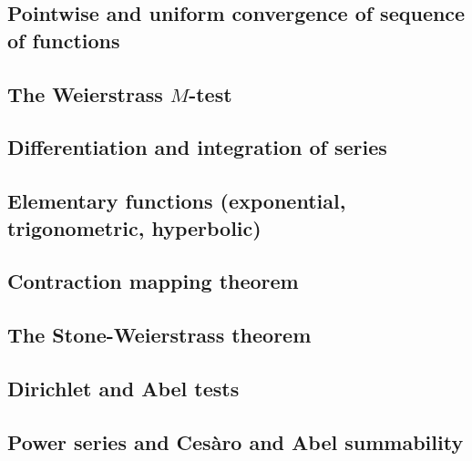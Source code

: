 \documentclass[11pt]{article}
\theoremstyle{definition}
\theoremstyle{plain}
\theoremstyle{remark}
\begin{document}
\subsection{Pointwise and uniform convergence of sequence of functions}

\subsection{The Weierstrass $M$-test}

\subsection{Differentiation and integration of series}

\subsection{Elementary functions (exponential, trigonometric, hyperbolic)}

\subsection{Contraction mapping theorem}

\subsection{The Stone-Weierstrass theorem}

\subsection{Dirichlet and Abel tests}

\subsection{Power series and Cesàro and Abel summability}
\end{document}
